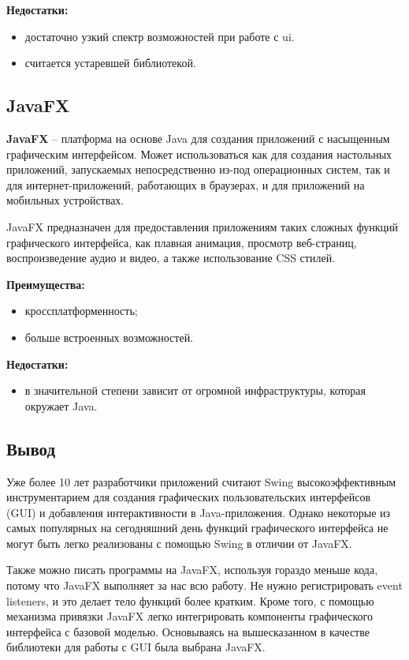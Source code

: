 \textbf{Недостатки:} 
\begin{itemize}
	\item достаточно узкий спектр возможностей при работе с ui.
	\item считается устаревшей библиотекой.
\end{itemize}


\subsection{JavaFX}

\textbf{JavaFX} -- платформа на основе Java для создания приложений с насыщенным графическим интерфейсом. Может использоваться как для создания настольных приложений, запускаемых непосредственно из-под операционных систем, так и для интернет-приложений, работающих в браузерах, и для приложений на мобильных устройствах. 

JavaFX предназначен для предоставления приложениям таких сложных функций графического интерфейса, как плавная анимация, просмотр веб-страниц, воспроизведение аудио и видео, а также использование CSS стилей.

\textbf{Преимущества:} 
\begin{itemize}
	\item кроссплатформенность;
	\item больше встроенных возможностей.
\end{itemize}

\textbf{Недостатки:} 
\begin{itemize}
	\item в значительной степени зависит от огромной инфраструктуры, которая окружает Java.
\end{itemize}



\subsection*{Вывод}

Уже более 10 лет разработчики приложений считают Swing высокоэффективным инструментарием для создания графических пользовательских интерфейсов (GUI) и добавления интерактивности в Java-приложения. Однако некоторые из самых популярных на сегодняшний день функций графического интерфейса не могут быть легко реализованы с помощью Swing в отличии от JavaFX. 

Также можно писать программы на JavaFX, используя гораздо меньше кода, потому что JavaFX выполняет за нас всю работу. Не нужно регистрировать event listeners, и это делает тело функций более кратким. Кроме того, с помощью механизма привязки JavaFX легко интегрировать компоненты графического интерфейса с базовой моделью. Основываясь на вышесказанном в качестве библиотеки для работы с GUI была выбрана JavaFX.

